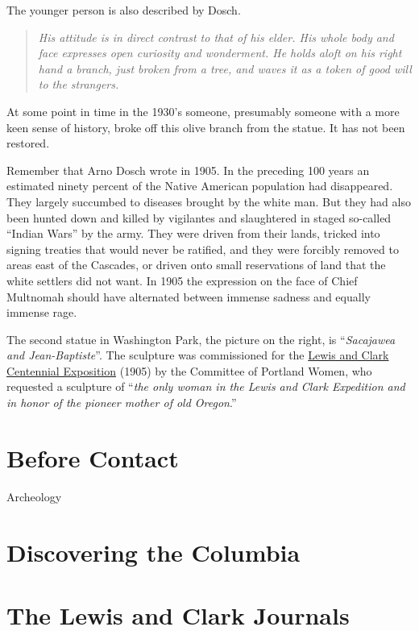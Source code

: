 \documentclass[
  12pt,
]{book}
\begin{document}
The younger person is also described by Dosch.

\begin{quote}
\emph{His attitude is in direct contrast to that of his elder. His whole body and face expresses open curiosity and wonderment. He holds aloft on his right hand a branch, just broken from a tree, and waves it as a token of good will to the strangers.}
\end{quote}

At some point in time in the 1930's someone, presumably someone with a more keen sense of history, broke off this olive branch from the statue. It has not been restored.

Remember that Arno Dosch wrote in 1905. In the preceding 100 years an estimated ninety percent of the Native American population had disappeared. They largely succumbed to diseases brought by the white man. But they had also been hunted down and killed by vigilantes and slaughtered in staged so-called ``Indian Wars'' by the army. They were driven from their lands, tricked into signing treaties that would never be ratified, and they were forcibly removed to areas east of the Cascades, or driven onto small reservations of land that the white settlers did not want. In 1905 the expression on the face of Chief Multnomah should have alternated between immense sadness and equally immense rage.

The second statue in Washington Park, the picture on the right, is ``\emph{Sacajawea and Jean-Baptiste}''. The sculpture was commissioned for the \href{https://en.wikipedia.org/wiki/Lewis_and_Clark_Centennial_Exposition}{Lewis and Clark Centennial Exposition} (1905) by the Committee of Portland Women, who requested a sculpture of ``\emph{the only woman in the Lewis and Clark Expedition and in honor of the pioneer mother of old Oregon}.''

\hypertarget{before-contact}{%
\section{Before Contact}\label{before-contact}}

Archeology

\hypertarget{discovering-the-columbia}{%
\section{Discovering the Columbia}\label{discovering-the-columbia}}

\hypertarget{the-lewis-and-clark-journals}{%
\section{The Lewis and Clark Journals}\label{the-lewis-and-clark-journals}}
\end{document}

